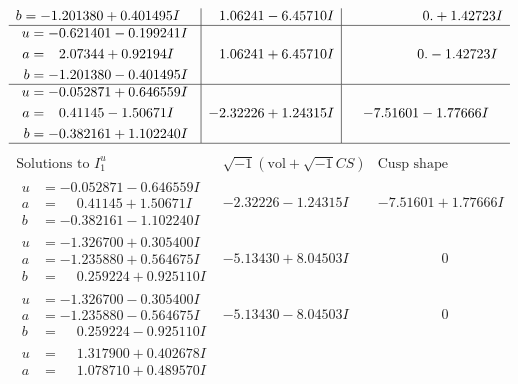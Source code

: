 \documentclass[1p]{elsarticle_modified}
\theoremstyle{definition}
\newcommand{\I}{\sqrt{-1}}
\begin{document}
$$\begin{array}{c|c|c}
\begin{aligned}
b &= -1.201380 + 0.401495 I\end{aligned}
 & \phantom{-}1.06241 - 6.45710 I & \phantom{-0.000000 -}0. + 1.42723 I \\ \hline\begin{aligned}
u &= -0.621401 - 0.199241 I \\
a &= \phantom{-}2.07344 + 0.92194 I \\
b &= -1.201380 - 0.401495 I\end{aligned}
 & \phantom{-}1.06241 + 6.45710 I & \phantom{-0.000000 } 0. - 1.42723 I \\ \hline\begin{aligned}
u &= -0.052871 + 0.646559 I \\
a &= \phantom{-}0.41145 - 1.50671 I \\
b &= -0.382161 + 1.102240 I\end{aligned}
 & -2.32226 + 1.24315 I & -7.51601 - 1.77666 I\\
 \hline 
 \end{array}$$\newpage$$\begin{array}{c|c|c}  
\text{Solutions to }I^u_{1}& \I (\text{vol} + \sqrt{-1}CS) & \text{Cusp shape}\\
 \hline 
\begin{aligned}
u &= -0.052871 - 0.646559 I \\
a &= \phantom{-}0.41145 + 1.50671 I \\
b &= -0.382161 - 1.102240 I\end{aligned}
 & -2.32226 - 1.24315 I & -7.51601 + 1.77666 I \\ \hline\begin{aligned}
u &= -1.326700 + 0.305400 I \\
a &= -1.235880 + 0.564675 I \\
b &= \phantom{-}0.259224 + 0.925110 I\end{aligned}
 & -5.13430 + 8.04503 I & \phantom{-0.000000 } 0 \\ \hline\begin{aligned}
u &= -1.326700 - 0.305400 I \\
a &= -1.235880 - 0.564675 I \\
b &= \phantom{-}0.259224 - 0.925110 I\end{aligned}
 & -5.13430 - 8.04503 I & \phantom{-0.000000 } 0 \\ \hline\begin{aligned}
u &= \phantom{-}1.317900 + 0.402678 I \\
a &= \phantom{-}1.078710 + 0.489570 I \\

\end{aligned}
\end{array}$$
\end{document}
